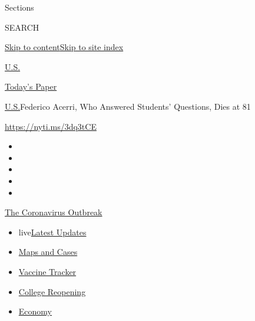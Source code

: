 Sections

SEARCH

\protect\hyperlink{site-content}{Skip to
content}\protect\hyperlink{site-index}{Skip to site index}

\href{https://www.nytimes3xbfgragh.onion/section/us}{U.S.}

\href{https://myaccount.nytimes3xbfgragh.onion/auth/login?response_type=cookie\&client_id=vi}{}

\href{https://www.nytimes3xbfgragh.onion/section/todayspaper}{Today's
Paper}

\href{/section/us}{U.S.}\textbar{}Federico Acerri, Who Answered
Students' Questions, Dies at 81

\url{https://nyti.ms/3dq3tCE}

\begin{itemize}
\item
\item
\item
\item
\item
\end{itemize}

\href{https://www.nytimes3xbfgragh.onion/news-event/coronavirus?action=click\&pgtype=Article\&state=default\&region=TOP_BANNER\&context=storylines_menu}{The
Coronavirus Outbreak}

\begin{itemize}
\tightlist
\item
  live\href{https://www.nytimes3xbfgragh.onion/2020/08/04/world/coronavirus-covid-19.html?action=click\&pgtype=Article\&state=default\&region=TOP_BANNER\&context=storylines_menu}{Latest
  Updates}
\item
  \href{https://www.nytimes3xbfgragh.onion/interactive/2020/us/coronavirus-us-cases.html?action=click\&pgtype=Article\&state=default\&region=TOP_BANNER\&context=storylines_menu}{Maps
  and Cases}
\item
  \href{https://www.nytimes3xbfgragh.onion/interactive/2020/science/coronavirus-vaccine-tracker.html?action=click\&pgtype=Article\&state=default\&region=TOP_BANNER\&context=storylines_menu}{Vaccine
  Tracker}
\item
  \href{https://www.nytimes3xbfgragh.onion/2020/08/02/us/covid-college-reopening.html?action=click\&pgtype=Article\&state=default\&region=TOP_BANNER\&context=storylines_menu}{College
  Reopening}
\item
  \href{https://www.nytimes3xbfgragh.onion/live/2020/08/03/business/stock-market-today-coronavirus?action=click\&pgtype=Article\&state=default\&region=TOP_BANNER\&context=storylines_menu}{Economy}
\end{itemize}


